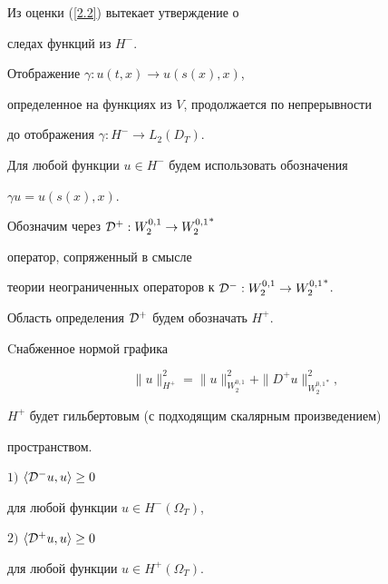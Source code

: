 Из оценки (\ref{2.2}) вытекает утверждение о


следах функций из $H^-$.





\begin{lem}


Отображение $\gamma: u(t,x) \to u (s(x),x)$, 


определенное на функциях из $V$, продолжается по непрерывности


до отображения $\gamma: H^- \to L_2(D_T)$.


\end{lem}


 


Для любой функции $u\in H^-$ будем использовать обозначения


$\gamma u=u(s(x),x)$.





Обозначим через ${\cal D}^+:W_2^{0,1}\to{W_2^{0,1}}^*$


оператор, сопряженный в смысле 


теории неограниченных операторов к ${\cal D}^-:W_2^{0,1}\to{W_2^{0,1}}^*$.


Область определения ${\cal D}^+$ будем обозначать $H^+$.


Cнабженное нормой графика


$$


\|u\|^2_{H^+}=\|u\|^2_{W_2^{0,1}}+\|D^+u\|^2_{{W_2^{0,1}}^*},


$$


$H^+$ будет гильбертовым (с подходящим скалярным произведением)


пространством.





\begin{lem}


$1)$ $\langle{\cal D}^-u, u\rangle \geq 0$


для любой функции $u\in H^-(\Omega_T)$,





$2) $ $\langle{\cal D}^+u, u\rangle \geq 0$


для любой функции $u\in H^+(\Omega_T)$.


\end{lem}






